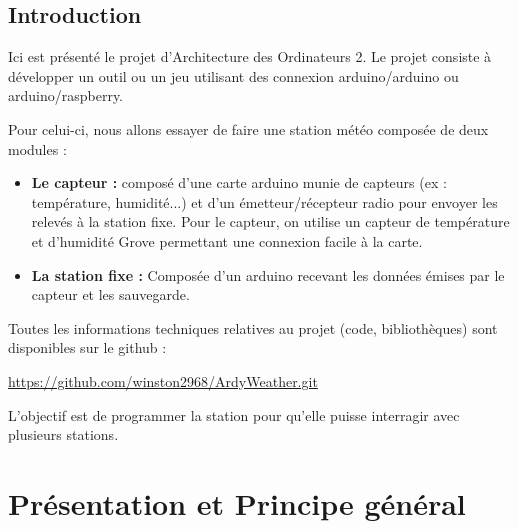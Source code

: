 \documentclass[a4paper]{article}
\begin{document}



\tableofcontents


\justify

\subsection{Introduction}


Ici est présenté le projet d'Architecture des Ordinateurs 2. Le projet consiste à développer un outil ou un jeu 
utilisant des connexion arduino/arduino ou arduino/raspberry. 

Pour celui-ci, nous allons essayer de faire une station météo composée de deux modules : 
\begin{itemize}
    \item \textbf{Le capteur : } composé d'une carte arduino munie de capteurs (ex : température, humidité...) et d'un émetteur/récepteur 
    radio pour envoyer les relevés à la station fixe. 
    Pour le capteur, on utilise un {capteur de température et d'humidité Grove} permettant 
    une connexion facile à la carte. 
    \item \textbf{La station fixe : } Composée d'un arduino recevant les données émises par le capteur et les 
    sauvegarde. 
\end{itemize}

Toutes les informations techniques relatives au projet (code, bibliothèques) sont disponibles sur le github : 
\begin{center}
    \href{https://github.com/winston2968/ArdyWeather.git}{https://github.com/winston2968/ArdyWeather.git}
\end{center}

L'objectif est de programmer la station pour qu'elle puisse interragir avec plusieurs 
stations. 


\newpage 


\section{Présentation et Principe général}
\end{document}
